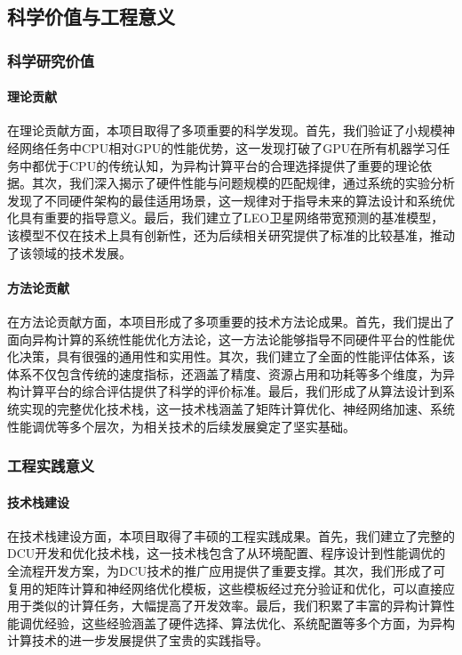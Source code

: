 \documentclass[a4paper]{article}
\begin{document}
\subsection{科学价值与工程意义}

\subsubsection{科学研究价值}

\paragraph{理论贡献}

在理论贡献方面，本项目取得了多项重要的科学发现。首先，我们验证了小规模神经网络任务中CPU相对GPU的性能优势，这一发现打破了GPU在所有机器学习任务中都优于CPU的传统认知，为异构计算平台的合理选择提供了重要的理论依据。其次，我们深入揭示了硬件性能与问题规模的匹配规律，通过系统的实验分析发现了不同硬件架构的最佳适用场景，这一规律对于指导未来的算法设计和系统优化具有重要的指导意义。最后，我们建立了LEO卫星网络带宽预测的基准模型，该模型不仅在技术上具有创新性，还为后续相关研究提供了标准的比较基准，推动了该领域的技术发展。

\paragraph{方法论贡献}

在方法论贡献方面，本项目形成了多项重要的技术方法论成果。首先，我们提出了面向异构计算的系统性能优化方法论，这一方法论能够指导不同硬件平台的性能优化决策，具有很强的通用性和实用性。其次，我们建立了全面的性能评估体系，该体系不仅包含传统的速度指标，还涵盖了精度、资源占用和功耗等多个维度，为异构计算平台的综合评估提供了科学的评价标准。最后，我们形成了从算法设计到系统实现的完整优化技术栈，这一技术栈涵盖了矩阵计算优化、神经网络加速、系统性能调优等多个层次，为相关技术的后续发展奠定了坚实基础。

\subsubsection{工程实践意义}

\paragraph{技术栈建设}

在技术栈建设方面，本项目取得了丰硕的工程实践成果。首先，我们建立了完整的DCU开发和优化技术栈，这一技术栈包含了从环境配置、程序设计到性能调优的全流程开发方案，为DCU技术的推广应用提供了重要支撑。其次，我们形成了可复用的矩阵计算和神经网络优化模板，这些模板经过充分验证和优化，可以直接应用于类似的计算任务，大幅提高了开发效率。最后，我们积累了丰富的异构计算性能调优经验，这些经验涵盖了硬件选择、算法优化、系统配置等多个方面，为异构计算技术的进一步发展提供了宝贵的实践指导。
\end{document}
